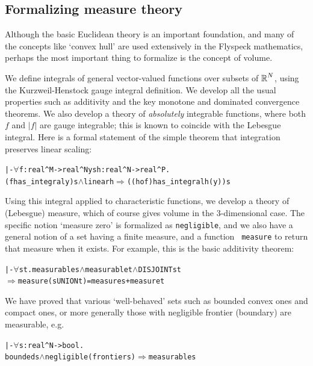 \documentclass[11pt]{amsart}
\def\sz{small} %
\newcommand{\real}{\mbox{$\protect\mathbb R$}}
\let\And=\wedge                    %
\newcommand{\Imp}{\Rightarrow}
\begin{document}
\subsection{Formalizing measure theory}

Although the basic Euclidean theory is an important foundation, and many of the
concepts like `convex hull' are used extensively in the Flyspeck mathematics,
perhaps the most important thing to formalize is the concept of volume.

We define integrals of general vector-valued functions over subsets of
$\real^N$, using the Kurzweil-Henstock gauge integral definition. We develop
all the usual properties such as additivity and the key monotone and dominated
convergence theorems. We also develop a theory of {\em absolutely} integrable
functions, where both $f$ and $|f|$ are gauge integrable; this is known to
coincide with the Lebesgue integral. Here is a formal statement of the simple
theorem that integration preserves linear scaling:

\begin{\sz}
\begin{alltt}
|- \(\forall\)f:real^M->real^N y s h:real^N->real^P.
   (f has_integral y) s \(\And\) linear h \(\Imp\) ((h o f) has_integral h(y)) s
\end{alltt}
\end{\sz}

Using this integral applied to characteristic functions, we develop a theory of
(Lebesgue) measure, which of course gives volume in the 3-dimensional case. The
specific notion `measure zero' is formalized as {\tt negligible}, and we also
have a general notion of a set having a finite measure, and a function {\tt
measure} to return that measure when it exists. For example, this is the basic
additivity theorem:

\begin{\sz}
\begin{alltt}
|- \(\forall\)s t. measurable s \(\And\) measurable t \(\And\) DISJOINT s t
         \(\Imp\) measure(s UNION t) = measure s + measure t
\end{alltt}
\end{\sz}

We have proved that various `well-behaved' sets such as bounded convex ones and
compact ones, or more generally those with negligible frontier (boundary) are
measurable, e.g.

\begin{\sz}
\begin{alltt}
|- \(\forall\)s:real^N->bool. 
           bounded s \(\And\) negligible(frontier s) \(\Imp\) measurable s
\end{alltt}
\end{\sz}
\end{document}
